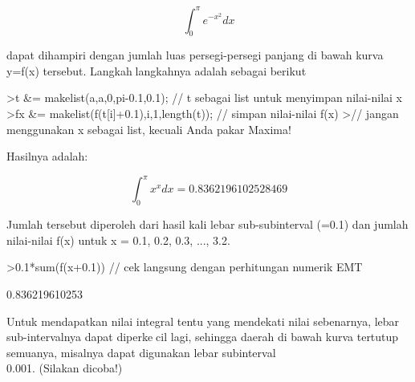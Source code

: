 \documentclass[12pt,Times new roman,letterpaper]{book}
\begin{document}
\begin{eulernootebook}
\begin{eulercomment}
\begin{eulercomment}
\begin{eulernootebook}
\begin{eulercomment}
\begin{eulercomment}
\begin{eulercomment}
\begin{eulercomment}
\begin{eulercomment}
\begin{eulercomment}
\begin{eulernotebook}
\begin{eulercomment}
\begin{eulercomment}
\begin{eulercomment}
\begin{eulercomment}
\begin{eulercomment}
\begin{eulercomment}
\begin{eulercomment}
\begin{eulercomment}
\begin{eulercomment}
\end{eulercomment}
\begin{eulerformula}
\[
\int_{0}^{\pi}e^{-x^2}dx
\]
\end{eulerformula}
\begin{eulercomment}
dapat dihampiri dengan jumlah luas persegi-persegi panjang di bawah
kurva y=f(x) tersebut. Langkahlangkahnya adalah sebagai berikut
\end{eulercomment}
\begin{eulerprompt}
>t &= makelist(a,a,0,pi-0.1,0.1); // t sebagai list untuk menyimpan nilai-nilai x
>fx &= makelist(f(t[i]+0.1),i,1,length(t)); // simpan nilai-nilai f(x)
>// jangan menggunakan x sebagai list, kecuali Anda pakar Maxima!
\end{eulerprompt}
\begin{eulercomment}
Hasilnya adalah:

\end{eulercomment}
\begin{eulerformula}
\[
\int_{0}^{\pi}x^x dx=0.8362196102528469
\]
\end{eulerformula}
\begin{eulercomment}
Jumlah tersebut diperoleh dari hasil kali lebar sub-subinterval (=0.1)
dan jumlah nilai-nilai f(x) untuk x = 0.1, 0.2, 0.3, ..., 3.2.
\end{eulercomment}
\begin{eulerprompt}
>0.1*sum(f(x+0.1)) // cek langsung dengan perhitungan numerik EMT
\end{eulerprompt}
\begin{euleroutput}
  0.836219610253
\end{euleroutput}
\begin{eulercomment}
Untuk mendapatkan nilai integral tentu yang mendekati nilai
sebenarnya, lebar sub-intervalnya dapat diperkecil lagi, sehingga
daerah di bawah kurva tertutup semuanya, misalnya dapat digunakan
lebar subinterval\\
0.001. (Silakan dicoba!)


\end{eulercomment}
\end{eulercomment}
\end{eulercomment}
\end{eulercomment}
\end{eulercomment}
\end{eulercomment}
\end{eulercomment}
\end{eulercomment}
\end{eulercomment}
\end{eulernotebook}
\end{eulercomment}
\end{eulercomment}
\end{eulercomment}
\end{eulercomment}
\end{eulercomment}
\end{eulercomment}
\end{eulernootebook}
\end{eulercomment}
\end{eulercomment}
\end{eulernootebook}
\end{document}
